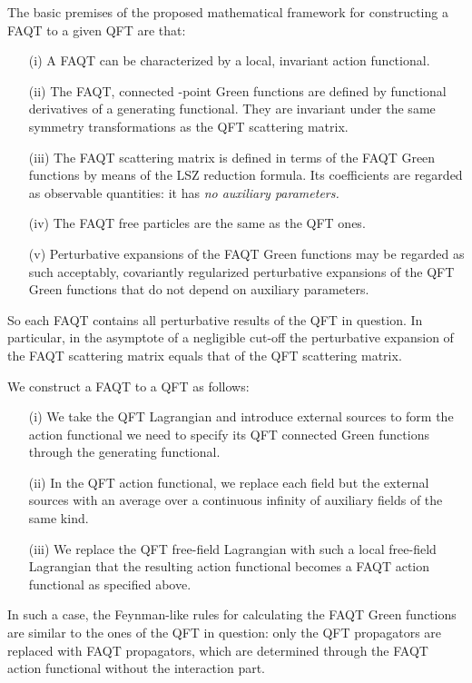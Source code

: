 \documentclass[a4paper,12pt]{article}
\begin{document}
The basic premises of the proposed mathematical framework for constructing a FAQT to a given QFT are that:
\begin{itemize}
\item[(i)]A FAQT can be characterized by a local, invariant action functional.
\item[(ii)]The FAQT, connected \coordHE{}-point Green functions are defined by functional derivatives of a generating functional. They are invariant under the same symmetry transformations as the QFT scattering matrix.
\item[(iii)]The FAQT scattering matrix is defined in terms of the FAQT Green functions by means of the LSZ reduction formula. Its coefficients are regarded as observable quantities: it has \it no auxiliary parameters. \rm
\item[(iv)]The FAQT free particles are the same as the QFT ones.
\item[(v)]Perturbative expansions of the FAQT Green functions may be regarded as such acceptably, covariantly regularized perturbative expansions of the QFT Green functions that do not depend on auxiliary parameters.
\end{itemize}
So each FAQT contains all perturbative results of the QFT in question. In particular, in the asymptote of a negligible cut-off the perturbative expansion of the FAQT scattering matrix equals that of the QFT scattering matrix.

We construct a FAQT to a QFT as follows:
\begin{itemize}
\item[(i)]We take the QFT Lagrangian and introduce external sources to form the action functional we need to specify its QFT connected Green functions through the generating functional.
\item[(ii)]In the QFT action functional, we replace each field but the external sources with an average over a continuous infinity of auxiliary fields of the same kind.
\item[(iii)]We replace the QFT free-field Lagrangian with such a local free-field Lagrangian that the resulting action functional becomes a FAQT action functional as specified above.
\end{itemize}
In such a case, the Feynman-like rules for calculating the FAQT Green functions are similar to the ones of the QFT in question: only the QFT propagators are replaced with FAQT propagators, which are determined through the FAQT action functional without the interaction part.
\end{document}
